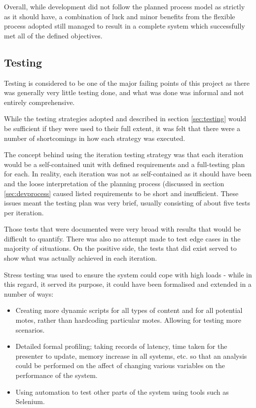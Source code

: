 \documentclass[a4papert,11pt,notitlepage]{article}
\begin{document}
Overall, while development did not follow the planned process model as strictly as it should have, a combination of luck and minor benefits from the flexible process adopted still managed to result in a complete system which successfully met all of the defined objectives.

\subsection{Testing}
Testing is considered to be one of the major failing points of this project as there was generally very little testing done, and what was done was informal and not entirely comprehensive.

While the testing strategies adopted and described in section \ref{sec:testing} would be sufficient if they were used to their full extent, it was felt that there were a number of shortcomings in how each strategy was executed.

The concept behind using the iteration testing strategy was that each iteration would be a self-contained unit with defined requirements and a full-testing plan for each. In reality, each iteration was not as self-contained as it should have been and the loose interpretation of the planning process (discussed in section \ref{sec:devprocess} caused listed requirements to be short and insufficient. These issues meant the testing plan was very brief, usually consisting of about five tests per iteration.

Those tests that were documented were very broad with results that would be difficult to quantify. There was also no attempt made to test edge cases in the majority of situations. On the positive side, the tests that did exist served to show what was actually achieved in each iteration.

Stress testing was used to ensure the system could cope with high loads - while in this regard, it served its purpose, it could have been formalised and extended in a number of ways:
\begin{itemize}
\item Creating more dynamic scripts for all types of content and for all potential motes, rather than hardcoding particular motes. Allowing for testing more scenarios.
\item Detailed formal profiling; taking records of latency, time taken for the presenter to update, memory increase in all systems, etc. so that an analysis could be performed on the affect of changing various variables on the performance of the system.
\item Using automation to test other parts of the system using tools such as Selenium\cite{selenium:web}.
\end{itemize}
\end{document}
